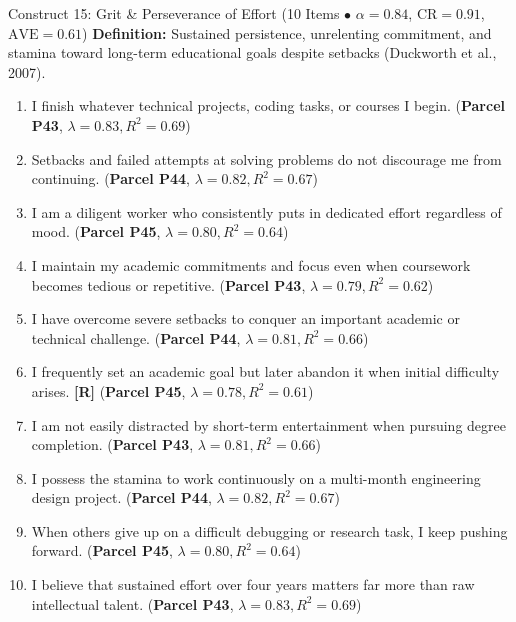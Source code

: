 \documentclass[10pt,a4paper]{article}
\begin{document}
\newpage
\begin{constructbox}{Construct 15: Grit \& Perseverance of Effort (10 Items $\bullet$ $\alpha = 0.84$, $\text{CR} = 0.91$, $\text{AVE} = 0.61$)}
\textbf{Definition:} Sustained persistence, unrelenting commitment, and stamina toward long-term educational goals despite setbacks (Duckworth et al., 2007).
\begin{enumerate}[label=\textbf{Q\arabic*.}, leftmargin=2.5em, itemsep=2pt, resume]
  \item I finish whatever technical projects, coding tasks, or courses I begin. \hfill (\textbf{Parcel P43}, $\lambda = 0.83, R^2 = 0.69$)
  \item Setbacks and failed attempts at solving problems do not discourage me from continuing. \hfill (\textbf{Parcel P44}, $\lambda = 0.82, R^2 = 0.67$)
  \item I am a diligent worker who consistently puts in dedicated effort regardless of mood. \hfill (\textbf{Parcel P45}, $\lambda = 0.80, R^2 = 0.64$)
  \item I maintain my academic commitments and focus even when coursework becomes tedious or repetitive. \hfill (\textbf{Parcel P43}, $\lambda = 0.79, R^2 = 0.62$)
  \item I have overcome severe setbacks to conquer an important academic or technical challenge. \hfill (\textbf{Parcel P44}, $\lambda = 0.81, R^2 = 0.66$)
  \item I frequently set an academic goal but later abandon it when initial difficulty arises. \textbf{[R]} \hfill (\textbf{Parcel P45}, $\lambda = 0.78, R^2 = 0.61$)
  \item I am not easily distracted by short-term entertainment when pursuing degree completion. \hfill (\textbf{Parcel P43}, $\lambda = 0.81, R^2 = 0.66$)
  \item I possess the stamina to work continuously on a multi-month engineering design project. \hfill (\textbf{Parcel P44}, $\lambda = 0.82, R^2 = 0.67$)
  \item When others give up on a difficult debugging or research task, I keep pushing forward. \hfill (\textbf{Parcel P45}, $\lambda = 0.80, R^2 = 0.64$)
  \item I believe that sustained effort over four years matters far more than raw intellectual talent. \hfill (\textbf{Parcel P43}, $\lambda = 0.83, R^2 = 0.69$)
\end{enumerate}
\end{constructbox}
\end{document}
